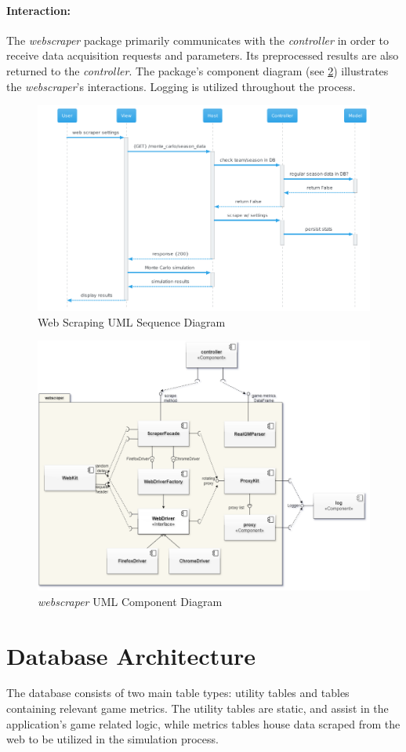 \documentclass{thesis-ekf}
\theoremstyle{definition}
\theoremstyle{remark}
\begin{document}
{\paragraph{Interaction:}
The \emph{webscraper} package primarily communicates with the \emph{controller} in order to receive data acquisition requests and parameters. Its preprocessed results are also returned to the \emph{controller}. The package's component diagram (see \ref{img-webscraper-component}) illustrates the \emph{webscraper}'s interactions. Logging is utilized throughout the process.
\begin{figure}[th!]
	\centering
	\includegraphics[width=0.9\linewidth]{img/sequence/scraping/scraping_caerilian}
	\caption{Web Scraping UML Sequence Diagram}
	\label{img-scraping-sequence}
\end{figure}
\begin{figure}[th!]
	\centering
	\includegraphics[width=0.7\linewidth]{img/component/component_webscraper}
	\caption{\emph{webscraper} UML Component Diagram}
	\label{img-webscraper-component}
\end{figure}

\section{Database Architecture}
The database consists of two main table types: utility tables and tables containing relevant game metrics. The utility tables are static, and assist in the application's game related logic, while metrics tables house data scraped from the web to be utilized in the simulation process. 

}
\end{document}
